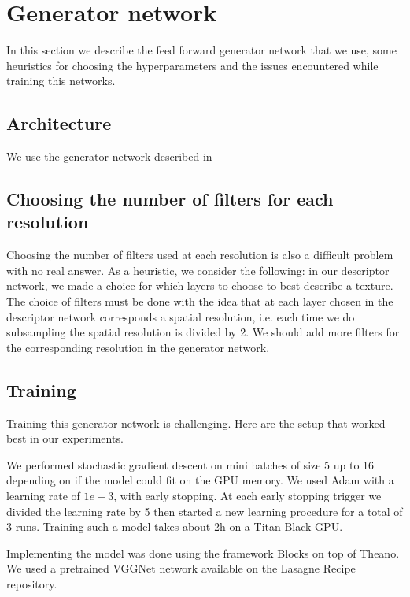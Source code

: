 \documentclass{article}
\begin{document}
\section{Generator network}

In this section we describe the feed forward generator network that we use, some heuristics for choosing the hyperparameters and the issues encountered while training this networks.

\subsection{Architecture}

We use the generator network described in 

\subsection{Choosing the number of filters for each resolution}

Choosing the number of filters used at each resolution is also a difficult problem with no real answer. As a heuristic, we consider the following: in our descriptor network, we made a choice for which layers to choose to best describe a texture. The choice of filters must be done with the idea that at each layer chosen in the descriptor network corresponds a spatial resolution, i.e. each time we do subsampling the spatial resolution is divided by 2. We should add more filters for the corresponding resolution in the generator network.

\subsection{Training}

Training this generator network is challenging. Here are the setup that worked best in our experiments.

We performed stochastic gradient descent on mini batches of size 5 up to 16 depending on if the model could fit on the GPU memory. We used Adam\cite{kingma2014adam} with a learning rate of $1e-3$, with early stopping. At each early stopping trigger we divided the learning rate by 5 then started a new learning procedure for a total of 3 runs. Training such a model takes about 2h on a Titan Black GPU.

Implementing the model was done using the framework Blocks \cite{van2015blocks} on top of Theano. We used a pretrained VGGNet network available on the Lasagne Recipe repository.
\end{document}
